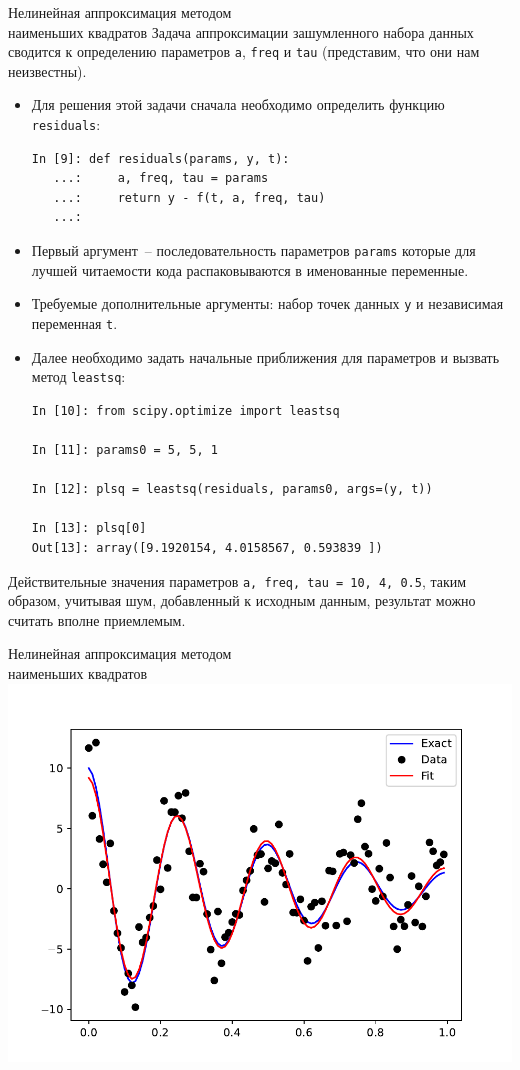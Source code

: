 \documentclass[aspectratio=169, mathserif]{beamer}	%
\begin{document}
\begin{frame}[fragile]{Нелинейная аппроксимация методом \\ наименьших квадратов}
\scriptsize
Задача аппроксимации зашумленного набора данных сводится к определению параметров \texttt{a}, \texttt{freq} и \texttt{tau} (представим, что они нам неизвестны). 
\begin{itemize}
	\item Для решения этой задачи сначала необходимо определить функцию \texttt{residuals}:

\begin{lstlisting}[language=iPython, numbers=none,  frame=none, ]
In [9]: def residuals(params, y, t):
   ...:     a, freq, tau = params
   ...:     return y - f(t, a, freq, tau)
   ...:
\end{lstlisting}

	\item Первый аргумент~-- последовательность параметров \texttt{params} которые для лучшей читаемости кода распаковываются в именованные переменные. 
	\item Требуемые дополнительные аргументы: набор точек данных \texttt{y} и независимая переменная \texttt{t}. 
	\item Далее необходимо задать начальные приближения для параметров и вызвать метод \texttt{leastsq}:

\begin{lstlisting}[language=iPython, numbers=none,  frame=none, ]
In [10]: from scipy.optimize import leastsq

In [11]: params0 = 5, 5, 1

In [12]: plsq = leastsq(residuals, params0, args=(y, t))

In [13]: plsq[0]
Out[13]: array([9.1920154, 4.0158567, 0.593839 ])
\end{lstlisting}

\end{itemize}

Действительные значения параметров \texttt{a, freq, tau = 10, 4, 0.5}, таким образом, учитывая шум, добавленный к исходным данным, результат можно считать вполне приемлемым.
\vfill
\end{frame}


\begin{frame}[fragile]{Нелинейная аппроксимация методом \\ наименьших квадратов}
\scriptsize
\centering
	\includegraphics[width=.68\linewidth]{./pics/Figure_39}
\vfill
\end{frame}
\end{document}
